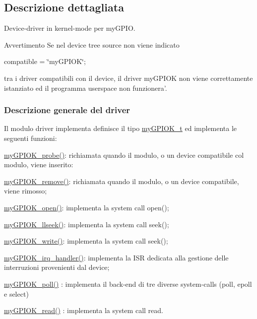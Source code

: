 \subsection{Descrizione dettagliata}
Device-\/driver in kernel-\/mode per my\+G\+P\+I\+O. 

\begin{DoxyWarning}{Avvertimento}
Se nel device tree source non viene indicato \begin{center}compatible = \char`\"{}my\+G\+P\+I\+O\+K\char`\"{};\end{center}  tra i driver compatibili con il device, il driver my\+G\+P\+I\+O\+K non viene correttamente istanziato ed il programma userspace non funzionera'.
\end{DoxyWarning}
\subsubsection*{Descrizione generale del driver}

Il modulo driver implementa definisce il tipo \hyperlink{structmy_g_p_i_o_k__t}{my\+G\+P\+I\+O\+K\+\_\+t} ed implementa le seguenti funzioni\+:
\begin{DoxyItemize}
\item \hyperlink{group___linux-_driver_gae40973a06d72f7c41a9af07513a62307}{my\+G\+P\+I\+O\+K\+\_\+probe()}\+: richiamata quando il modulo, o un device compatibile col modulo, viene inserito\+:
\item \hyperlink{group___linux-_driver_ga59fddfaa36dea357f4bbdfceb0f47f8c}{my\+G\+P\+I\+O\+K\+\_\+remove()}\+: richiamata quando il modulo, o un device compatibile, viene rimosso;
\item \hyperlink{group___linux-_driver_gad013759c18fbf6ea96005b9b3bfa5b4e}{my\+G\+P\+I\+O\+K\+\_\+open()}\+: implementa la system call open();
\item \hyperlink{group___linux-_driver_ga66e7f726b72320a272b633ecbaecefff}{my\+G\+P\+I\+O\+K\+\_\+llseek()}\+: implementa la system call seek();
\item \hyperlink{group___linux-_driver_ga1eea0f6c86e8966ba9b701da57502aad}{my\+G\+P\+I\+O\+K\+\_\+write()}\+: implementa la system call seek();
\item \hyperlink{group___linux-_driver_ga2fc230a12a97aa63e43b2dc4aec73511}{my\+G\+P\+I\+O\+K\+\_\+irq\+\_\+handler()}\+: implementa la I\+S\+R dedicata alla gestione delle interruzioni provenienti dal device;
\item \hyperlink{group___linux-_driver_gaba935e8a8215c2ebce9a7147fd4f5147}{my\+G\+P\+I\+O\+K\+\_\+poll()} \+: implementa il back-\/end di tre diverse system-\/calls (poll, epoll e select)
\item \hyperlink{group___linux-_driver_ga90ac339df9c02ae5f11a2a7727adc923}{my\+G\+P\+I\+O\+K\+\_\+read()} \+: implementa la system call read.
\end{DoxyItemize}

